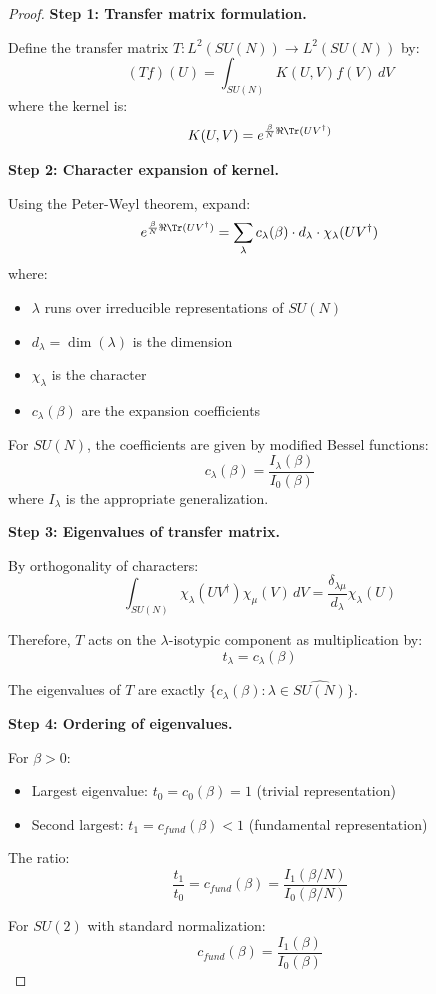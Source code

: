 \begin{proof}
\textbf{Step 1: Transfer matrix formulation.}

Define the transfer matrix $T: L^2(SU(N)) \to L^2(SU(N))$ by:
\[
(Tf)(U) = \int_{SU(N)} K(U, V) f(V) \, dV
\]
where the kernel is:
\[
K(U, V) = e^{\frac{\beta}{N}\Re\Tr(UV^\dagger)}
\]

\textbf{Step 2: Character expansion of kernel.}

Using the Peter-Weyl theorem, expand:
\[
e^{\frac{\beta}{N}\Re\Tr(UV^\dagger)} = \sum_{\lambda} c_\lambda(\beta) \cdot d_\lambda \cdot \chi_\lambda(UV^\dagger)
\]
where:
\begin{itemize}
\item $\lambda$ runs over irreducible representations of $SU(N)$
\item $d_\lambda = \dim(\lambda)$ is the dimension
\item $\chi_\lambda$ is the character
\item $c_\lambda(\beta)$ are the expansion coefficients
\end{itemize}

For $SU(N)$, the coefficients are given by modified Bessel functions:
\[
c_\lambda(\beta) = \frac{I_\lambda(\beta)}{I_0(\beta)}
\]
where $I_\lambda$ is the appropriate generalization.

\textbf{Step 3: Eigenvalues of transfer matrix.}

By orthogonality of characters:
\[
\int_{SU(N)} \chi_\lambda(UV^\dagger) \chi_\mu(V) \, dV = \frac{\delta_{\lambda\mu}}{d_\lambda} \chi_\lambda(U)
\]

Therefore, $T$ acts on the $\lambda$-isotypic component as multiplication by:
\[
t_\lambda = c_\lambda(\beta)
\]

The eigenvalues of $T$ are exactly $\{c_\lambda(\beta) : \lambda \in \widehat{SU(N)}\}$.

\textbf{Step 4: Ordering of eigenvalues.}

For $\beta > 0$:
\begin{itemize}
\item Largest eigenvalue: $t_0 = c_0(\beta) = 1$ (trivial representation)
\item Second largest: $t_1 = c_{fund}(\beta) < 1$ (fundamental representation)
\end{itemize}

The ratio:
\[
\frac{t_1}{t_0} = c_{fund}(\beta) = \frac{I_1(\beta/N)}{I_0(\beta/N)}
\]

For $SU(2)$ with standard normalization:
\[
c_{fund}(\beta) = \frac{I_1(\beta)}{I_0(\beta)}
\]


\end{proof}
